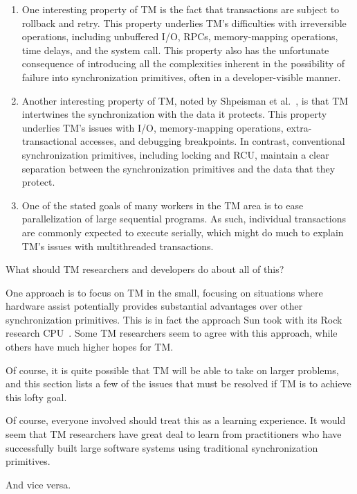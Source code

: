 \begin{enumerate}
\item	One interesting property of TM is the fact that transactions are
	subject to rollback and retry.
	This property underlies TM's difficulties with irreversible
	operations, including unbuffered I/O, RPCs, memory-mapping
	operations, time delays, and the  system call.
	This property also has the unfortunate consequence of introducing
	all the complexities inherent in the possibility of
	failure into synchronization primitives, often in a developer-visible
	manner.
\item	Another interesting property of TM, noted by
	Shpeisman et al.~\cite{TatianaShpeisman2009CppTM}, is that TM
	intertwines the synchronization with the data it protects.
	This property underlies TM's issues with I/O, memory-mapping
	operations, extra-transactional accesses, and debugging
	breakpoints.
	In contrast, conventional synchronization primitives, including
	locking and RCU, maintain a clear separation between the
	synchronization primitives and the data that they protect.
\item	One of the stated goals of many workers in the TM area is to
	ease parallelization of large sequential programs.
	As such, individual transactions are commonly expected to
	execute serially, which might do much to explain TM's issues
	with multithreaded transactions.
\end{enumerate}

What should TM researchers and developers do about all of this?

One approach is to focus on TM in the small, focusing on situations
where hardware assist potentially provides substantial advantages over
other synchronization primitives.
This is in fact the approach Sun took with its Rock research
CPU~\cite{DaveDice2009ASPLOSRockHTM}.
Some TM researchers seem to agree with this approach, while others have
much higher hopes for TM.

Of course, it is quite possible that TM will be able to take on larger
problems, and this section lists a few of the issues that
must be resolved if TM is to achieve this lofty goal.

Of course, everyone involved should treat this as a learning experience.
It would seem that TM researchers have great deal to learn from
practitioners who have successfully built large software systems using
traditional synchronization primitives.

And vice versa.

